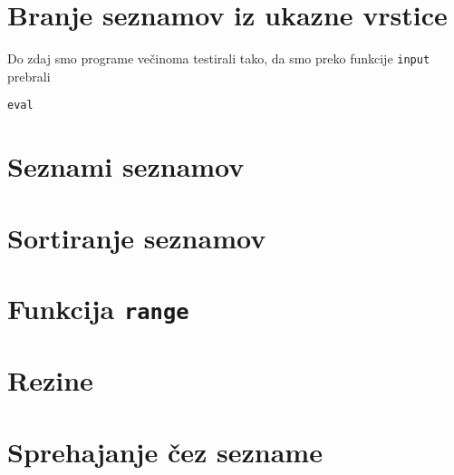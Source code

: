 \section{Branje seznamov iz ukazne vrstice}
Do zdaj smo programe večinoma testirali tako, da smo preko funkcije \texttt{input} prebrali 


\texttt{eval}

\section{Seznami seznamov}

\section{Sortiranje seznamov}

\section{Funkcija \texttt{range}}

\section{Rezine}

\section{Sprehajanje čez sezname}